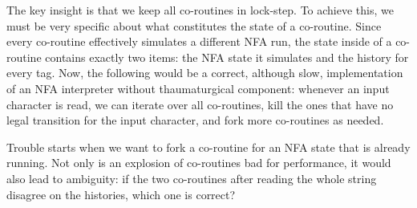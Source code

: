 \documentclass[11pt,a4paper,twoside,openright]{Thesis}
\theoremstyle{definition}
\begin{document}
The key insight is that we keep all co-routines in lock-step. To achieve this,
we must be very specific about what constitutes the state of a co-routine.
Since every co-routine effectively simulates a different NFA run, the state
inside of a co-routine contains exactly two items: the NFA state it simulates
and the history for every tag. Now, the following would be a correct, although
slow, implementation of an NFA interpreter without thaumaturgical component:
whenever an input character is read, we can iterate over all co-routines, kill
the ones that have no legal transition for the input character, and fork more
co-routines as needed.

Trouble starts when we want to fork a co-routine for an NFA state that
is already running. Not only is an explosion of co-routines bad for
performance, it would also lead to ambiguity: if the two co-routines
after reading the whole string disagree on the histories, which one is correct?
\end{document}

